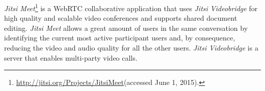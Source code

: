 \emph{Jitsi Meet}\footnote{\url{http://jitsi.org/Projects/JitsiMeet}(accessed June 1, 2015).} is a \ac{WebRTC} collaborative application that uses \emph{Jitsi Videobridge} for high quality and scalable video conferences and supports shared document editing. \emph{Jitsi Meet} allows a great amount of users in the same conversation by identifying the current most active participant users and, by consequence, reducing the video and audio quality for all the other users. \emph{Jitsi Videobridge} is a server that enables multi-party video calls. 



